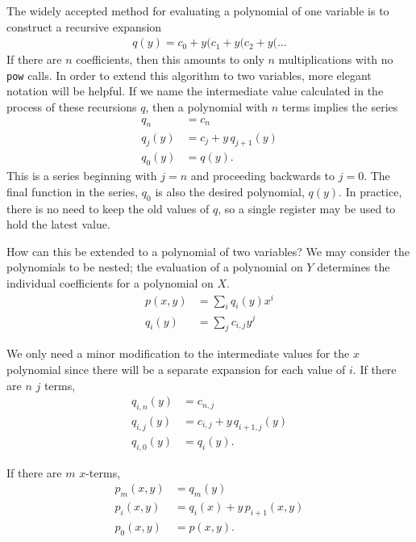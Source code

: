 The widely accepted method for evaluating a polynomial of one variable is to construct a recursive expansion
\begin{align}
q(y) = c_0 + y ( c_1 + y ( c_2 + y ( \ldots
\end{align}
If there are $n$ coefficients, then this amounts to only $n$ multiplications with no \verb|pow| calls.  In order to extend this algorithm to two variables, more elegant notation will be helpful.  If we name the intermediate value calculated in the process of these recursions $q$, then a polynomial with $n$ terms implies the series
\begin{align}
q_n &= c_n\\
q_j(y) &= c_j + y\,q_{j+1}(y)\\
q_0(y) &= q(y).
\end{align}
This is a series beginning with $j=n$ and proceeding backwards to $j=0$.  The final function in the series, $q_0$ is also the desired polynomial, $q(y)$.  In practice, there is no need to keep the old values of $q$, so a single register may be used to hold the latest value.

How can this be extended to a polynomial of two variables?  We may consider the polynomials to be nested; the evaluation of a polynomial on $Y$ determines the individual coefficients for a polynomial on $X$.
\begin{align}
p(x,y) &= \sum_i q_i(y) x^i\\
q_i(y) &= \sum_j c_{i,j} y^j
\end{align}

We only need a minor modification to the intermediate values for the $x$ polynomial since there will be a separate expansion for each value of $i$.  If there are $n$ $j$ terms,
\begin{subequations}
\begin{align}
q_{i,n}(y) &= c_{n,j}\\
q_{i,j}(y) &= c_{i,j} + y\,q_{i+1,j}(y)\\
q_{i,0}(y) &= q_i(y).
\end{align}
\end{subequations}

If there are $m$ $x$-terms,
\begin{subequations}
\begin{align}
p_m(x,y) &= q_m(y)\\
p_i(x,y) &= q_i(x) + y\,p_{i+1}(x,y)\\
p_0(x,y) &= p(x,y).
\end{align}
\end{subequations}


